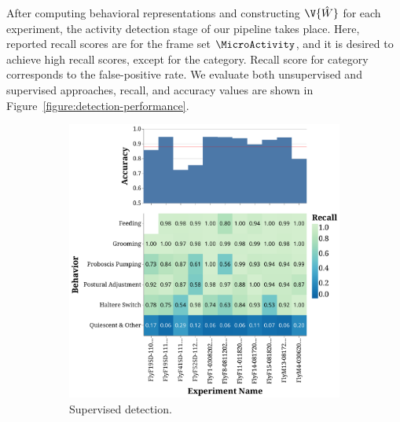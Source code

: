 After computing behavioral representations and constructing $\V{\hat{W}}$ for each experiment, the activity detection stage of our pipeline takes place.
Here, reported recall scores are for the frame set $\MicroActivity$, and it is desired to achieve high recall scores, except for the \QuiescentOther category.
Recall score for \QuiescentOther category corresponds to the false-positive rate.
We evaluate both unsupervised and supervised approaches, recall, and accuracy values are shown in Figure~\ref{figure:detection-performance}.

\begin{figure}[htb!]
	\centering
	\begin{subfigure}[b]{0.495\linewidth}
		\centering\includegraphics[width=\linewidth]{figures/ActivityDetectionPerformance-Supervised.pdf}
		\caption{Supervised detection.}
	\end{subfigure}%
	\hfill
	\begin{subfigure}[b]{0.495\linewidth}

\end{subfigure}
\end{figure}
